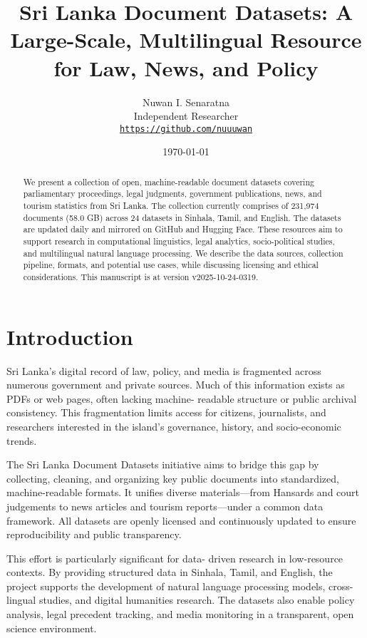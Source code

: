 \documentclass[10pt,a4paper]{article}%
\title{Sri Lanka Document Datasets: A Large{-}Scale, Multilingual Resource for Law, News, and Policy}%
\author{Nuwan I. Senaratna\\Independent Researcher\\\vspace{0.25em}\texttt{\href{https://github.com/nuuuwan}{https://github.com/nuuuwan}}}%
\date{\today}%
\begin{document}
%
\normalsize%
\maketitle%
\begin{abstract}%
We present a collection of open, machine-readable document datasets covering parliamentary proceedings, legal judgments, government publications, news, and tourism statistics from Sri Lanka. The collection currently comprises of  231,974  documents (58.0 GB) across 24  datasets in Sinhala, Tamil, and English. The datasets are updated daily and mirrored on GitHub and Hugging Face. These resources aim to support research in computational linguistics, legal analytics, socio-political studies, and multilingual natural language processing. We describe the data sources, collection pipeline, formats, and potential use cases, while discussing licensing and ethical considerations. This manuscript is at version v2025-10-24-0319.%

%
\end{abstract}%
\section{Introduction}%
\label{sec:Introduction}%
Sri Lanka’s digital record of law, policy, and media is fragmented across numerous government and private sources. Much of this information exists as PDFs or web pages, often lacking machine- readable structure or public archival consistency. This fragmentation limits access for citizens, journalists, and researchers interested in the island’s governance, history, and socio-economic trends.%

%
The Sri Lanka Document Datasets initiative aims to bridge this gap by collecting, cleaning, and organizing key public documents into standardized, machine-readable formats. It unifies diverse materials—from Hansards and court judgements to news articles and tourism reports—under a common data framework. All datasets are openly licensed and continuously updated to ensure reproducibility and public transparency.%

%
This effort is particularly significant for data- driven research in low-resource contexts. By providing structured data in Sinhala, Tamil, and English, the project supports the development of natural language processing models, cross-lingual studies, and digital humanities research. The datasets also enable policy analysis, legal precedent tracking, and media monitoring in a transparent, open science environment.%
\end{document}
